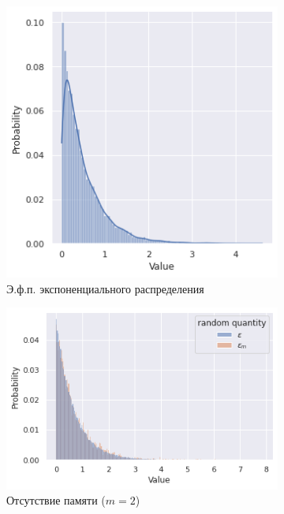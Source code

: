     \begin{figure}[tbp]
        \centering
        \begin{subfigure}[b]{0.4\textwidth}
            \centering
            \includegraphics[width=\textwidth]{resources/task3_exp.png}
            \caption{Э.ф.п. экспоненциального распределения}
            \label{task3_exp}
        \end{subfigure}
        \hfill
        \begin{subfigure}[b]{0.5\textwidth}
            \centering
            \includegraphics[width=\textwidth]{resources/task3_memoexp.png}
            \caption{Отсутствие памяти ($m = 2$)}
            \label{task3_memoexp}
        \end{subfigure}
        \caption{}
    \end{figure}

